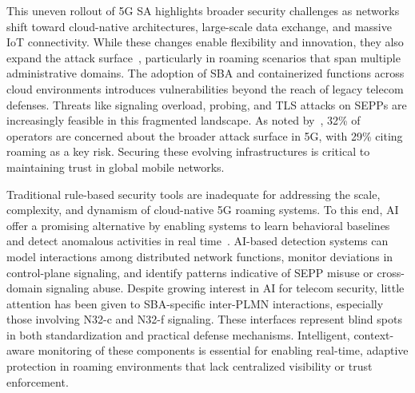 \documentclass[journal,article,submit,moreauthors,pdftex]{Definitions/tsp}
\begin{document}
This uneven rollout of 5G SA highlights broader security challenges as networks shift toward cloud-native architectures, large-scale data exchange, and massive IoT connectivity. While these changes enable flexibility and innovation, they also expand the attack surface~\cite{shinEnhancingCloudnativeDevSecOps2025, kumarComprehensiveReviewVulnerabilities2024, uddinDenialServiceAttacks2024, aslanComprehensiveReviewCyber2023, arisdakessianSurveyIoTIntrusion2023, sajidEnhancingIntrusionDetection2024}, particularly in roaming scenarios that span multiple administrative domains. The adoption of SBA and containerized functions across cloud environments introduces vulnerabilities beyond the reach of legacy telecom defenses. Threats like signaling overload, probing, and TLS attacks on SEPPs are increasingly feasible in this fragmented landscape. As noted by~\cite{SecuringPrivateNetworks2021}, 32\% of operators are concerned about the broader attack surface in 5G, with 29\% citing roaming as a key risk. Securing these evolving infrastructures is critical to maintaining trust in global mobile networks.

Traditional rule-based security tools are inadequate for addressing the scale, complexity, and dynamism of cloud-native 5G roaming systems. To this end, AI offer a promising alternative by enabling systems to learn behavioral baselines and detect anomalous activities in real time~\cite{sajidEnhancingIntrusionDetection2024,pawanaLightweightLLMBasedAnomaly2025,altunayHybridCNNLSTMbasedIntrusion2023,kasongoDeepLearningTechnique2023}. AI-based detection systems can model interactions among distributed network functions, monitor deviations in control-plane signaling, and identify patterns indicative of SEPP misuse or cross-domain signaling abuse. Despite growing interest in AI for telecom security, little attention has been given to SBA-specific inter-PLMN interactions, especially those involving N32-c and N32-f signaling. These interfaces represent blind spots in both standardization and practical defense mechanisms. Intelligent, context-aware monitoring of these components is essential for enabling real-time, adaptive protection in roaming environments that lack centralized visibility or trust enforcement.
\end{document}
